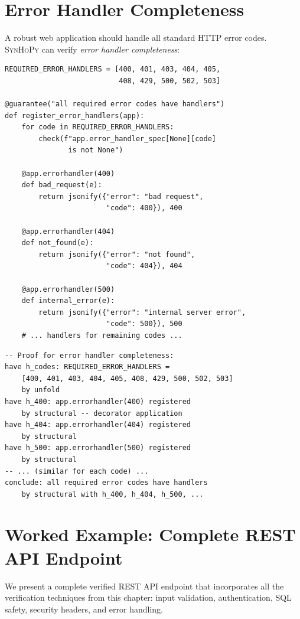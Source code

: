 \documentclass[11pt,a4paper]{report}
\theoremstyle{definition}
\theoremstyle{plain}
\newcommand{\synhopy}{\textsc{SynHoPy}}
\begin{document}
\section{Error Handler Completeness}

A robust web application should handle all standard HTTP error codes.
\synhopy{} can verify \emph{error handler completeness}:

\begin{lstlisting}[style=synhopy]
REQUIRED_ERROR_HANDLERS = [400, 401, 403, 404, 405,
                           408, 429, 500, 502, 503]

@guarantee("all required error codes have handlers")
def register_error_handlers(app):
    for code in REQUIRED_ERROR_HANDLERS:
        check(f"app.error_handler_spec[None][code]
               is not None")

    @app.errorhandler(400)
    def bad_request(e):
        return jsonify({"error": "bad request",
                        "code": 400}), 400

    @app.errorhandler(404)
    def not_found(e):
        return jsonify({"error": "not found",
                        "code": 404}), 404

    @app.errorhandler(500)
    def internal_error(e):
        return jsonify({"error": "internal server error",
                        "code": 500}), 500
    # ... handlers for remaining codes ...
\end{lstlisting}

\begin{lstlisting}[style=proof]
-- Proof for error handler completeness:
have h_codes: REQUIRED_ERROR_HANDLERS =
    [400, 401, 403, 404, 405, 408, 429, 500, 502, 503]
    by unfold
have h_400: app.errorhandler(400) registered
    by structural -- decorator application
have h_404: app.errorhandler(404) registered
    by structural
have h_500: app.errorhandler(500) registered
    by structural
-- ... (similar for each code) ...
conclude: all required error codes have handlers
    by structural with h_400, h_404, h_500, ...
\end{lstlisting}

\section{Worked Example: Complete REST API Endpoint}

We present a complete verified REST API endpoint that incorporates all
the verification techniques from this chapter: input validation,
authentication, SQL safety, security headers, and error handling.
\end{document}
